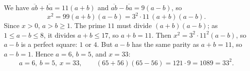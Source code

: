 We have $\overline{ab}+\overline{ba}=11(a+b)$ and $\overline{ab}-\overline{ba}=9(a-b)$, so
\[
x^2=99(a+b)(a-b)=3^2\cdot11\,(a+b)(a-b).
\]
Since $x>0$, $a>b\ge1$. The prime $11$ must divide $(a+b)(a-b)$; as $1\le a-b\le8$, it divides $a+b\le17$, so $a+b=11$. Then $x^2=3^2\cdot11^2(a-b)$, so $a-b$ is a perfect square: $1$ or $4$. But $a-b$ has the same parity as $a+b=11$, so $a-b=1$. Hence $a=6$, $b=5$, and $x=33$:
\[
\boxed{a=6,\ b=5,\ x=33},\qquad (65+56)(65-56)=121\cdot9=1089=33^2 .
\]
